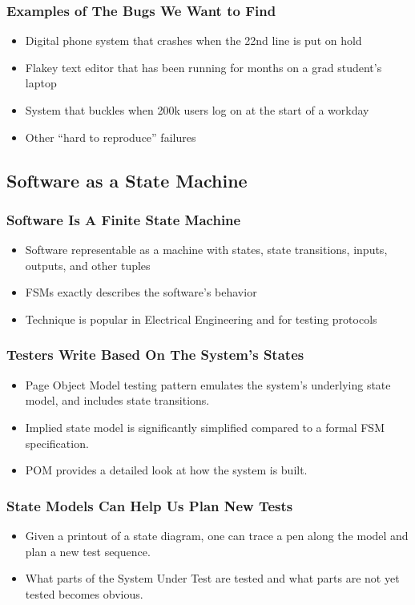 \begin{frame}
  \frametitle{Examples of The Bugs We Want to Find}
  \begin{itemize}
    \item Digital phone system that crashes when the 22nd line is put on hold
    \item Flakey text editor that has been running for months on a grad student's laptop
    \item System that buckles when 200k users log on at the start of a workday
    \item Other ``hard to reproduce'' failures
  \end{itemize}
\end{frame}

\subsection{Software as a State Machine}
\begin{frame}
  \frametitle{Software Is A Finite State Machine}
  \begin{itemize}
    \item Software representable as a machine with states, state transitions, inputs, outputs, and other tuples
    \item FSMs exactly describes the software's behavior
    \item Technique is popular in Electrical Engineering and for testing protocols
  \end{itemize}
\end{frame}

\begin{frame}
  \frametitle{Testers Write Based On The System's States}
  \begin{itemize}
    \item Page Object Model testing pattern emulates the system's underlying state model, and includes state transitions.
    \item Implied state model is significantly simplified compared to a formal FSM specification.
    \item POM provides a detailed look at how the system is built.
  \end{itemize}
\end{frame}

\begin{frame}
  \frametitle{State Models Can Help Us Plan New Tests}
  \begin{itemize}
    \item Given a printout of a state diagram, one can trace a pen along the model and plan a new test sequence.
    \item What parts of the System Under Test are tested and what parts are not yet tested becomes obvious.
  \end{itemize}
\end{frame}

